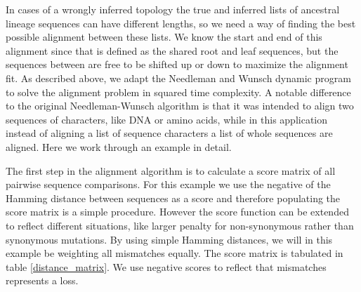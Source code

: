 In cases of a wrongly inferred topology the true and inferred lists of ancestral lineage sequences can have different lengths, so we need a way of finding the best possible alignment between these lists.
We know the start and end of this alignment since that is defined as the shared root and leaf sequences, but the sequences between are free to be shifted up or down to maximize the alignment fit.
As described above, we adapt the Needleman and Wunsch dynamic program \cite{needleman1970general} to solve the alignment problem in squared time complexity.
A notable difference to the original Needleman-Wunsch algorithm is that it was intended to align two sequences of characters, like DNA or amino acids, while in this application instead of aligning a list of sequence characters a list of whole sequences are aligned.
Here we work through an example in detail.

The first step in the alignment algorithm is to calculate a score matrix of all pairwise sequence comparisons.
For this example we use the negative of the Hamming distance between sequences as a score and therefore populating the score matrix is a simple procedure.
However the score function can be extended to reflect different situations, like larger penalty for non-synonymous rather than synonymous mutations.
By using simple Hamming distances, we will in this example be weighting all mismatches equally.
The score matrix is tabulated in table \ref{distance_matrix}.
We use negative scores to reflect that mismatches represents a loss.


